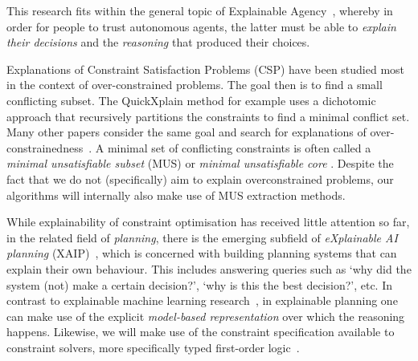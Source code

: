 This research fits within the general topic of Explainable Agency~\cite{langley2017explainable}, whereby in order for people to trust autonomous agents, the latter must be able to \textit{explain their decisions} and the \textit{reasoning} that produced their choices.



Explanations of Constraint Satisfaction Problems (CSP) have been studied most in the context of over-constrained problems.
The goal then is to find a small conflicting subset.
The QuickXplain method \cite{junker2001quickxplain} for example uses a dichotomic approach that recursively partitions the constraints to find a minimal conflict set. Many other papers consider the same goal and search for explanations of over-constrainedness~\cite{leo2017debugging,zeighami2018towards}.
A minimal set of conflicting constraints is often called a \emph{minimal unsatisfiable subset} (MUS) or \emph{minimal unsatisfiable core} \cite{marques2010minimal}. Despite the fact that we do not (specifically) aim to explain overconstrained problems, our algorithms will internally also make use of MUS extraction methods.


While explainability of constraint optimisation has received little attention so far, in the related field of \textit{planning}, there is the emerging subfield of \textit{eXplainable AI planning} (XAIP)~\cite{fox2017explainable}, which is concerned with building planning systems that can explain their own behaviour. This includes answering queries such as `why did the system (not) make a certain decision?', `why is this the best decision?', etc. In contrast to explainable machine learning research~\cite{guidotti2018survey}, in explainable planning one can make use of the explicit \textit{model-based representation} over which the reasoning happens. Likewise, we will make use of the constraint specification available to constraint solvers, more specifically typed first-order logic~\cite{atcl/Wittocx13}.

% 
% 


